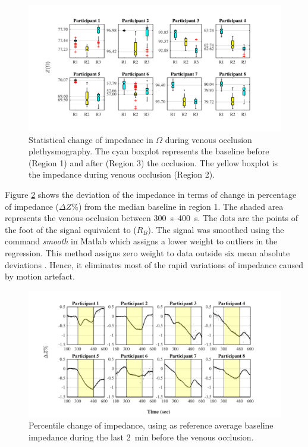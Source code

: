 \begin{figure}[htbp]
	\centering
	\includegraphics[width=15cm,keepaspectratio]{figure_vop_1}    
	\caption[Change of impedance during venous occlusion plethysmography]{Statistical change of impedance in $\Omega$ during venous occlusion plethysmography. The cyan boxplot represents the baseline before (Region 1) and after (Region 3) the occlusion. The yellow boxplot is the impedance during venous occlusion (Region 2).}
	\label{fig:venous statistics impedance}
\end{figure}  
 
Figure \ref{fig:venous occlusion impedance} shows the deviation of the impedance in terms of change in percentage of impedance ($\Delta Z\%$) from the median baseline in region 1. The shaded area represents the venous occlusion between \SIrange{300}{400}{\second}. The dots are the points of the foot of the signal equivalent to ($R_B$). The signal was smoothed using the command \textit{smooth} in Matlab which assigns a lower weight to outliers in the regression. This method assigns zero weight to data outside six mean absolute deviations \cite{MATLAB:2016}. Hence, it eliminates most of the rapid variations of impedance caused by motion artefact. 

\begin{figure}[htbp]
	\centering
	\includegraphics[width=15cm,keepaspectratio]{figure_vop_2}    
	\caption[Percentile variation of impedance during venous occlusion plethysmography]{Percentile change of impedance, using as reference average baseline impedance during the last \SI{2}{\minute} before the venous occlusion.}
	\label{fig:venous occlusion impedance}
\end{figure} 

